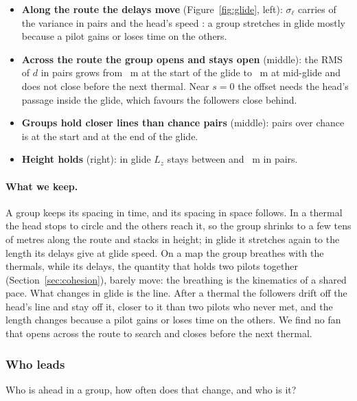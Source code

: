 \begin{itemize}
  \item \textbf{Along the route the delays move} (Figure~\ref{fig:glide}, left): $\sigma_\ell$
        carries \StGlSigmaPairs{} of the variance in pairs and the head's speed \StGlVPairs: a group
        stretches in glide mostly because a pilot gains or loses time on the others.
  \item \textbf{Across the route the group opens and stays open} (middle): the RMS of $d$ in pairs
        grows from \StGlDPairsStart~m at the start of the glide to \StGlDPairsMid~m at mid-glide and
        does not close before the next thermal. Near $s=0$ the offset needs the head's passage
        inside the glide, which favours the followers close behind.
  \item \textbf{Groups hold closer lines than chance pairs} (middle): pairs over chance is
        \StGlRatioStart{} \StGlRatioStartBand{} at the start and \StGlRatioEnd{}
        \StGlRatioEndBand{} at the end of the glide.
  \item \textbf{Height holds} (right): in glide $L_z$ stays between \StGlZPairsLow{} and
        \StGlZPairsHigh~m in pairs.
\end{itemize}
\paragraph{What we keep.} A group keeps its spacing in time, and its spacing in space follows.
In a thermal the head stops to circle and the others reach it, so the group shrinks to a few tens
of metres along the route and stacks in height; in glide it stretches again to the length its
delays give at glide speed. On a map the group breathes with the thermals, while its delays, the
quantity that holds two pilots together (Section~\ref{sec:cohesion}), barely move: the breathing is
the kinematics of a shared pace. What changes in glide is the line. After a thermal the followers
drift off the head's line and stay off it, closer to it than two pilots who never met, and the
length changes because a pilot gains or loses time on the others. We find no fan that opens across
the route to search and closes before the next thermal.

\subsubsection{Who leads}\label{sec:leaders}

Who is ahead in a group, how often does that change, and who is it?


